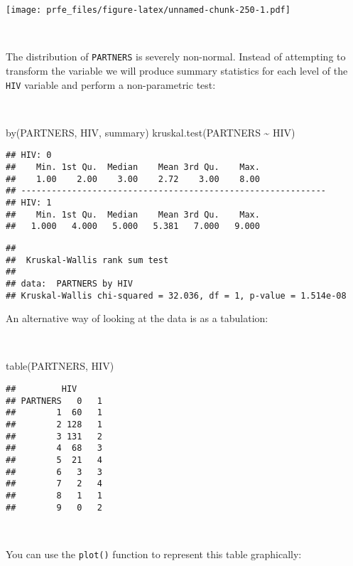 \documentclass[
  12pt,
  a4paper]{book}
\newenvironment{Shaded}{\begin{snugshade}}{\end{snugshade}}
\newcommand{\FunctionTok}[1]{\textcolor[rgb]{0.00,0.00,0.00}{#1}}
\newcommand{\NormalTok}[1]{#1}
\newcommand{\SpecialCharTok}[1]{\textcolor[rgb]{0.00,0.00,0.00}{#1}}
\begin{document}
\newpage

\texttt{[image: prfe\_files/figure-latex/unnamed-chunk-250-1.pdf]}

~

The distribution of \texttt{PARTNERS} is severely non-normal. Instead of attempting to transform the variable we will produce summary statistics for each level of the \texttt{HIV} variable and perform a non-parametric test:

~

\begin{Shaded}
\begin{Highlighting}[]
\FunctionTok{by}\NormalTok{(PARTNERS, HIV, summary)}
\FunctionTok{kruskal.test}\NormalTok{(PARTNERS }\SpecialCharTok{\textasciitilde{}}\NormalTok{ HIV)}
\end{Highlighting}
\end{Shaded}

\begin{verbatim}
## HIV: 0
##    Min. 1st Qu.  Median    Mean 3rd Qu.    Max. 
##    1.00    2.00    3.00    2.72    3.00    8.00 
## ------------------------------------------------------------ 
## HIV: 1
##    Min. 1st Qu.  Median    Mean 3rd Qu.    Max. 
##   1.000   4.000   5.000   5.381   7.000   9.000
\end{verbatim}

\begin{verbatim}
## 
##  Kruskal-Wallis rank sum test
## 
## data:  PARTNERS by HIV
## Kruskal-Wallis chi-squared = 32.036, df = 1, p-value = 1.514e-08
\end{verbatim}

\newpage

An alternative way of looking at the data is as a tabulation:

~

\begin{Shaded}
\begin{Highlighting}[]
\FunctionTok{table}\NormalTok{(PARTNERS, HIV)}
\end{Highlighting}
\end{Shaded}

\begin{verbatim}
##         HIV
## PARTNERS   0   1
##        1  60   1
##        2 128   1
##        3 131   2
##        4  68   3
##        5  21   4
##        6   3   3
##        7   2   4
##        8   1   1
##        9   0   2
\end{verbatim}

~

You can use the \texttt{plot()} function to represent this table graphically:
\end{document}
